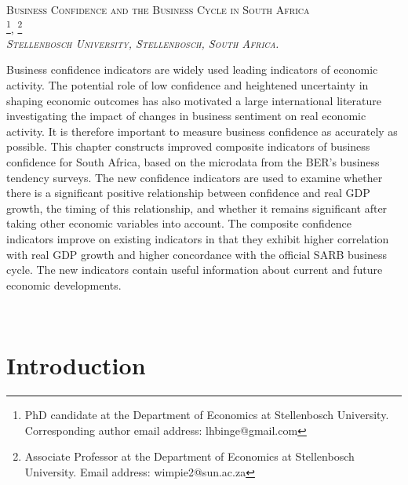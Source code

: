 \documentclass[11pt,]{article}
\title{}
\author{}
\date{}
\let\rmarkdownfootnote\footnote%
\def\footnote{\protect\rmarkdownfootnote}
\begin{document}
\begin{center}
\Large\scshape{Business Confidence and the Business Cycle in South Africa} \\ 
\vspace{1em}
\large{}\footnote{PhD candidate at the Department of Economics at Stellenbosch University. Corresponding author email address: lhbinge@gmail.com},
\large{}\footnote{Associate Professor at the Department of Economics at Stellenbosch University. Email address: wimpie2@sun.ac.za} \\
\normalsize\textit{Stellenbosch University, Stellenbosch, South Africa.} \\
\normalsize\normalfont{\today} 
\end{center}\begin{small}

Business confidence indicators are widely used leading indicators of economic activity. The potential role of low confidence and heightened uncertainty in shaping economic outcomes has also motivated a large international literature investigating the impact of changes in business sentiment on real economic activity. It is therefore important to measure business confidence as accurately as possible. This chapter constructs improved composite indicators of business confidence for South Africa, based on the microdata from the BER's business tendency surveys. The new confidence indicators are used to examine whether there is a significant positive relationship between confidence and real GDP growth, the timing of this relationship, and whether it remains significant after taking other economic variables into account. The composite confidence indicators improve on existing indicators in that they exhibit higher correlation with real GDP growth and higher concordance with the official SARB business cycle. The new indicators contain useful information about current and future economic developments. 

\vspace{0.5em}
 \\
\end{small}\renewcommand{\thefootnote}{\arabic{footnote}}

\renewcommand{\thefootnote}{\arabic{footnote}}

\section{Introduction}\label{introduction}
\end{document}
